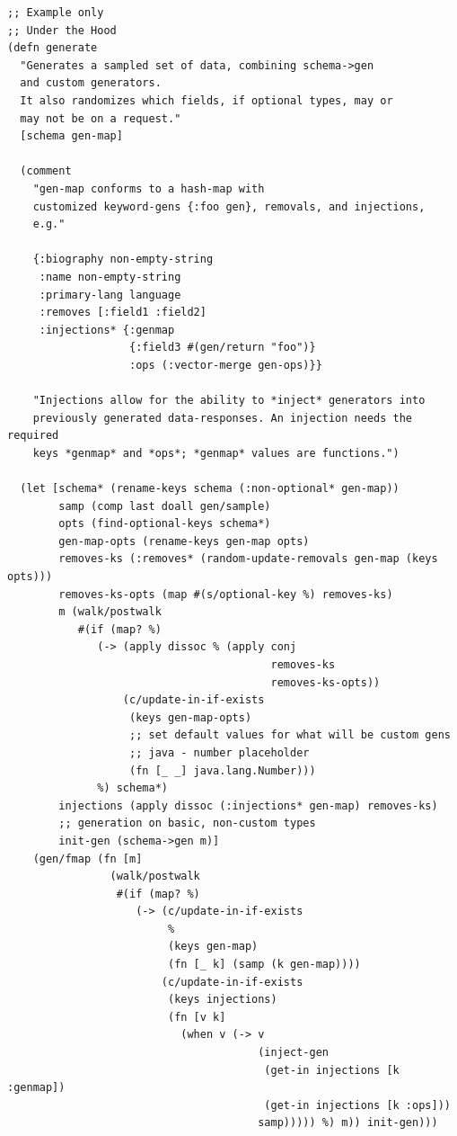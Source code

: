 \documentclass[11pt]{article}
\begin{document}
\begin{verbatim}
;; Example only
;; Under the Hood
(defn generate
  "Generates a sampled set of data, combining schema->gen
  and custom generators.
  It also randomizes which fields, if optional types, may or
  may not be on a request."
  [schema gen-map]

  (comment
    "gen-map conforms to a hash-map with
    customized keyword-gens {:foo gen}, removals, and injections,
    e.g."

    {:biography non-empty-string
     :name non-empty-string
     :primary-lang language
     :removes [:field1 :field2]
     :injections* {:genmap
                   {:field3 #(gen/return "foo")}
                   :ops (:vector-merge gen-ops)}}

    "Injections allow for the ability to *inject* generators into
    previously generated data-responses. An injection needs the required
    keys *genmap* and *ops*; *genmap* values are functions.")

  (let [schema* (rename-keys schema (:non-optional* gen-map))
        samp (comp last doall gen/sample)
        opts (find-optional-keys schema*)
        gen-map-opts (rename-keys gen-map opts)
        removes-ks (:removes* (random-update-removals gen-map (keys opts)))
        removes-ks-opts (map #(s/optional-key %) removes-ks)
        m (walk/postwalk
           #(if (map? %)
              (-> (apply dissoc % (apply conj
                                         removes-ks
                                         removes-ks-opts))
                  (c/update-in-if-exists
                   (keys gen-map-opts)
                   ;; set default values for what will be custom gens
                   ;; java - number placeholder
                   (fn [_ _] java.lang.Number)))
              %) schema*)
        injections (apply dissoc (:injections* gen-map) removes-ks)
        ;; generation on basic, non-custom types
        init-gen (schema->gen m)]
    (gen/fmap (fn [m]
                (walk/postwalk
                 #(if (map? %)
                    (-> (c/update-in-if-exists
                         %
                         (keys gen-map)
                         (fn [_ k] (samp (k gen-map))))
                        (c/update-in-if-exists
                         (keys injections)
                         (fn [v k]
                           (when v (-> v
                                       (inject-gen
                                        (get-in injections [k :genmap])
                                        (get-in injections [k :ops]))
                                       samp))))) %) m)) init-gen)))
\end{verbatim}
\end{document}
